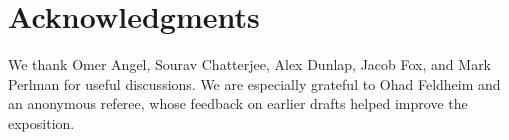 \documentclass[11pt,reqno]{amsart} %
\numberwithin{equation}{section}
\theoremstyle{definition}
\begin{document}
\section*{Acknowledgments}
We thank Omer Angel, Sourav Chatterjee, Alex Dunlap, Jacob Fox, and Mark Perlman for useful discussions.
We are especially grateful to Ohad Feldheim and an anonymous referee, whose feedback on earlier drafts helped improve the exposition.


\end{document}
